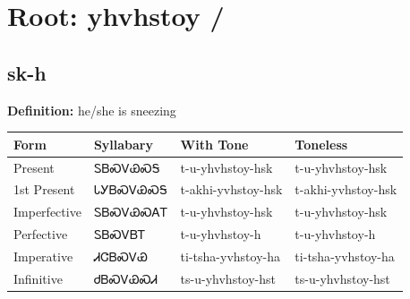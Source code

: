\documentclass{article}%
\begin{document}
%
\normalsize%
\section*{Root: yhvhstoy / }%
\subsection*{sk-h}%
\textbf{Definition: }%
he/she is sneezing%
\\[0.5em]%
\begin{tabular}{|l|l|l|l|}%
\hline%
\textbf{Form}&\textbf{Syllabary}&\textbf{With Tone}&\textbf{Toneless}\\%
\hline%
Present&ᏚᏴᏍᏙᏯᏍᎦ&t{-}u{-}yhvhstoy{-}hsk&t{-}u{-}yhvhstoy{-}hsk\\%
1st Present&ᏓᎩᏴᏍᏙᏯᏍᎦ&t{-}akhi{-}yvhstoy{-}hsk&t{-}akhi{-}yvhstoy{-}hsk\\%
Imperfective&ᏚᏴᏍᏙᏯᏍᎪᎢ&t{-}u{-}yhvhstoy{-}hsk&t{-}u{-}yhvhstoy{-}hsk\\%
Perfective&ᏚᏴᏍᏙᏴᎢ&t{-}u{-}yhvhstoy{-}h&t{-}u{-}yhvhstoy{-}h\\%
Imperative&ᏗᏣᏴᏍᏙᏯ&ti{-}tsha{-}yvhstoy{-}ha&ti{-}tsha{-}yvhstoy{-}ha\\%
Infinitive&ᏧᏴᏍᏙᏯᏍᏗ&ts{-}u{-}yhvhstoy{-}hst&ts{-}u{-}yhvhstoy{-}hst\\%
\hline%
\end{tabular}%
\\[1em]%
\end{document}
